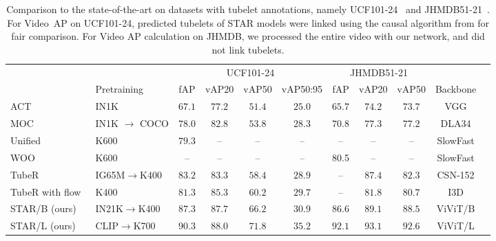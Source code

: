 \documentclass[10pt,twocolumn,letterpaper]{article}
\begin{document}
\begin{table*}[t]
	\centering
    \vspace{-0.2\baselineskip}
	\caption{Comparison to the state-of-the-art on datasets with tubelet annotations, namely UCF101-24~\cite{soomro_arxiv_2012} and JHMDB51-21~\cite{jhuang2013towards}.
	For Video~AP on UCF101-24, predicted tubelets of STAR models were linked using the causal algorithm from \cite{kalogeiton_iccv_2017,li2020actions} for fair comparison.
	For Video AP calculation on JHMDB, we processed the entire video with our network, and did not link tubelets.
	}
	\renewcommand{\arraystretch}{0.92}
	\begin{tabular}{llccccccccc}
		\toprule
		
		& & \multicolumn{4}{c}{UCF101-24} & \multicolumn{3}{c}{JHMDB51-21} \\
		\cmidrule(lr){3-6} \cmidrule(lr){7-9}
		
		& Pretraining & fAP & vAP20 & vAP50 & vAP50:95 & fAP & vAP20 & vAP50 & Backbone \\
		\midrule
		ACT~\cite{kalogeiton_iccv_2017} & IN1K & $67.1$ & $77.2$ & $51.4$ & $25.0$ & $65.7$ & $74.2$ & $73.7$ & VGG \\
		MOC~\cite{li2020actions} & IN1K $\to$ COCO & $78.0$ & $82.8$ & $53.8$ & $28.3$ & $70.8$ & $77.3$ & $77.2$ & DLA34 \\
		Unified~\cite{arnab2021unified} & K600 & $79.3$ &  -- & -- & -- & -- & -- & -- & SlowFast \\
		WOO~\cite{chen2021watch}  & K600 &  -- & -- & -- & -- &	80.5 & -- & -- & SlowFast \\
		TubeR~\cite{zhao2022tuber}      & IG65M$\to$K400             &  $83.2$  &  $83.3$  &  $58.4$  &  $28.9$  & --  & $87.4$ & $82.3$  &  CSN-152                 \\
		TubeR with flow~\cite{zhao2022tuber}           & K400     &  $81.3$  &  $85.3$  &  $60.2$     &  $29.7$  &  -- & $81.8$ & $80.7$  &  I3D   \vspace{0.3ex}    \\
		\midrule
		
		STAR/B (ours)  	 & IN21K$\to$K400  &  $87.3$  &  $87.7$  &  $66.2$  &  $30.9$  & $86.6$ & $89.1$ & $88.5$ & ViViT/B      \\  STAR/L (ours) & CLIP$\to$K700  &  $\mathbf{90.3}$  &  $\mathbf{88.0}$  &  $\mathbf{71.8}$  &  $\mathbf{35.2}$  & $\mathbf{92.1}$ & $\mathbf{93.1}$ & $\mathbf{92.6}$ & ViViT/L      \\  \bottomrule
	\end{tabular}
	\vspace{-1\baselineskip}
	\label{tab:sota_ucf101_jhmdb}
\end{table*} 
\end{document}
